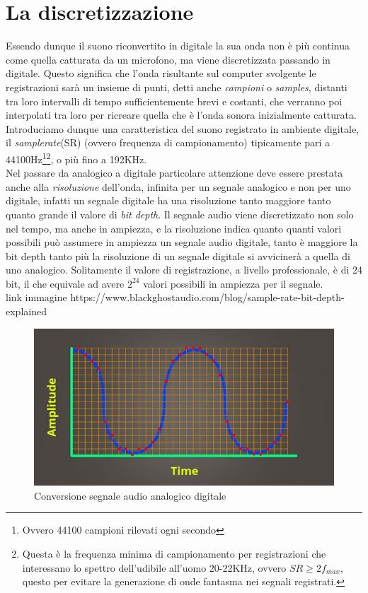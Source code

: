 \section{La discretizzazione}
Essendo dunque il suono riconvertito in digitale la sua onda non è più continua come quella catturata da un microfono, ma viene discretizzata passando in digitale. Questo significa che l'onda risultante sul computer svolgente le registrazioni sarà un insieme di punti, detti anche \emph{campioni} o \emph{samples}, distanti tra loro intervalli di tempo sufficientemente brevi e costanti, che verranno poi interpolati tra loro per ricreare quella che è l'onda sonora inizialmente catturata. Introduciamo dunque una caratteristica del suono registrato in ambiente digitale, il \emph{samplerate}(SR) (ovvero frequenza di campionamento) tipicamente pari a 44100Hz\footnote{Ovvero 44100 campioni rilevati ogni secondo}\footnote{Questa è la frequenza minima di campionamento per registrazioni che interessano lo spettro dell'udibile all'uomo 20-22KHz, ovvero $SR\ge2f_{max}$, questo per evitare la generazione di onde fantasma nei segnali registrati.}, o più fino a 192KHz.\\
Nel passare da analogico a digitale particolare attenzione deve essere prestata anche alla \emph{risoluzione} dell'onda, infinita per un segnale analogico e non per uno digitale, infatti un segnale digitale ha una risoluzione tanto maggiore tanto quanto grande il valore di \emph{bit depth}. Il segnale audio viene discretizzato non solo nel tempo, ma anche in ampiezza, e la risoluzione indica quanto quanti valori possibili può assumere in ampiezza un segnale audio digitale, tanto è maggiore la bit depth tanto più la risoluzione di un segnale digitale si avvicinerà a quella di uno analogico. Solitamente il valore di registrazione, a livello professionale, è di 24 bit, il che equivale ad avere $2^{24}$ valori possibili in ampiezza per il segnale.\\
link immagine
https://www.blackghostaudio.com/blog/sample-rate-bit-depth-explained
\begin{figure}[h]
	\begin{center}
		\includegraphics[scale=0.5]{./immagini/SR-bitdepth.jpeg}
	\end{center}
	\caption{Conversione segnale audio analogico digitale}\label{fig:SR-bitdepth}
\end{figure}


